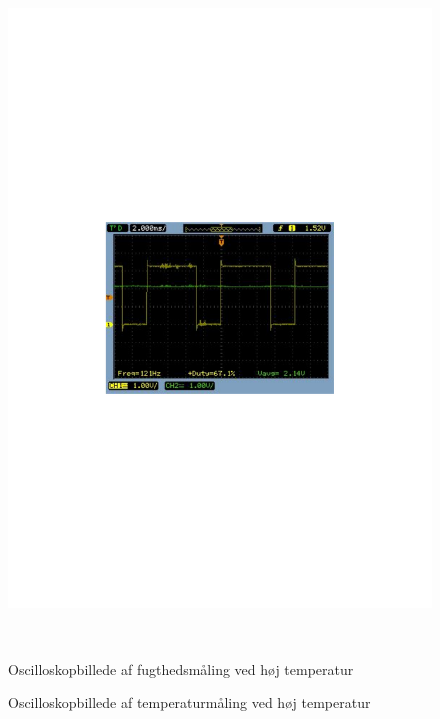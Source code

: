 \begin{figure}[H]
\begin{minipage}[b]{0.48\textwidth}
\includegraphics[width=1.00\textwidth]{filer/modultest/Billeder/SCOP_tempVARM} %
\end{minipage} \\ %
\begin{minipage}[t]{0.48\textwidth}
\caption{Oscilloskopbillede af fugthedsmåling ved høj temperatur} %
\label{fig:SCOP_FUGT_VARM}
\end{minipage} \hfill
\begin{minipage}[t]{0.48\textwidth}
\caption{Oscilloskopbillede af temperaturmåling ved høj temperatur} %
\label{fig:SCOP_TEMP_VARM}
\end{minipage}
\end{figure}

